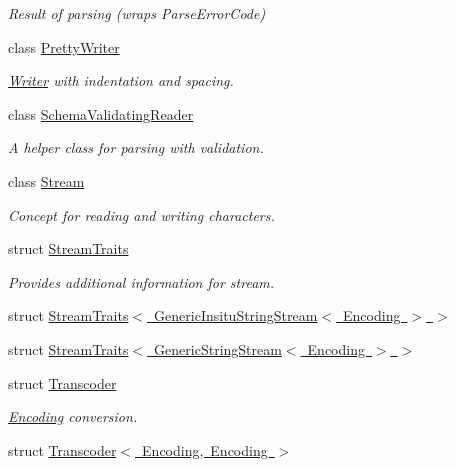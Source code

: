 \begin{DoxyCompactItemize}
\begin{DoxyCompactList}\small\item\em Result of parsing (wraps Parse\+Error\+Code) \end{DoxyCompactList}\item 
class \mbox{\hyperlink{classrapidjson_1_1_pretty_writer}{Pretty\+Writer}}
\begin{DoxyCompactList}\small\item\em \mbox{\hyperlink{classrapidjson_1_1_writer}{Writer}} with indentation and spacing. \end{DoxyCompactList}\item 
class \mbox{\hyperlink{classrapidjson_1_1_schema_validating_reader}{Schema\+Validating\+Reader}}
\begin{DoxyCompactList}\small\item\em A helper class for parsing with validation. \end{DoxyCompactList}\item 
class \mbox{\hyperlink{classrapidjson_1_1_stream}{Stream}}
\begin{DoxyCompactList}\small\item\em Concept for reading and writing characters. \end{DoxyCompactList}\item 
struct \mbox{\hyperlink{structrapidjson_1_1_stream_traits}{Stream\+Traits}}
\begin{DoxyCompactList}\small\item\em Provides additional information for stream. \end{DoxyCompactList}\item 
struct \mbox{\hyperlink{structrapidjson_1_1_stream_traits_3_01_generic_insitu_string_stream_3_01_encoding_01_4_01_4}{Stream\+Traits$<$ Generic\+Insitu\+String\+Stream$<$ Encoding $>$ $>$}}
\item 
struct \mbox{\hyperlink{structrapidjson_1_1_stream_traits_3_01_generic_string_stream_3_01_encoding_01_4_01_4}{Stream\+Traits$<$ Generic\+String\+Stream$<$ Encoding $>$ $>$}}
\item 
struct \mbox{\hyperlink{structrapidjson_1_1_transcoder}{Transcoder}}
\begin{DoxyCompactList}\small\item\em \mbox{\hyperlink{classrapidjson_1_1_encoding}{Encoding}} conversion. \end{DoxyCompactList}\item 
struct \mbox{\hyperlink{structrapidjson_1_1_transcoder_3_01_encoding_00_01_encoding_01_4}{Transcoder$<$ Encoding, Encoding $>$}}

\end{DoxyCompactItemize}
